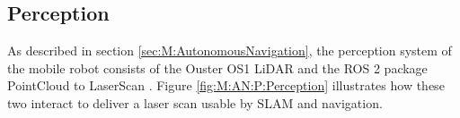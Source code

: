 

\subsection{Perception}\label{sec:M:AN:Perception}
As described in section \ref{sec:M:AutonomousNavigation}, the perception system of the mobile robot consists of the Ouster OS1 LiDAR and the ROS 2 package PointCloud to LaserScan \cite{pointcloud_to_laserscan_repo}. Figure \ref{fig:M:AN:P:Perception} illustrates how these two interact to deliver a laser scan usable by SLAM and navigation.


